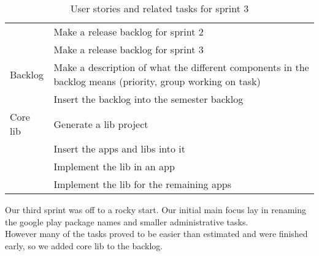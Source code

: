 \begin{table}[H]
\begin{tabular}{ll}
		& Make a release backlog for sprint 2 \\
		& Make a release backlog for sprint 3 \\ \hline
		Backlog & Make a description of what the different components in the backlog means (priority, group working on task) \\
		& Insert the backlog into the semester backlog \\ \hline
		Core lib & Generate a lib project \\
		& Insert the apps and libs into it \\
		& Implement the lib in an app \\
		& Implement the lib for the remaining apps \\ \hline
	\end{tabular}
	\caption{User stories and related tasks for sprint 3}
	\label{Sprint3_UserStories3_table}
\end{table}

Our third sprint was off to a rocky start. Our initial main focus lay in renaming the google play package names and smaller administrative tasks.\\
However many of the tasks proved to be easier than estimated and were finished early, so we added core lib to the backlog.\\